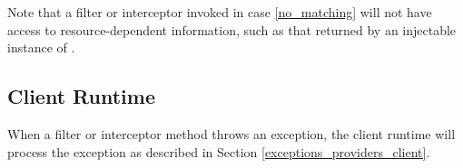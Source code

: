 Note that a filter or interceptor invoked in case \ref{no_matching} will not have access to resource-dependent information, such as that returned by an injectable instance of .

\subsection{Client Runtime}

When a filter or interceptor method throws an exception, the client runtime will process the exception as described in Section \ref{exceptions_providers_client}.
